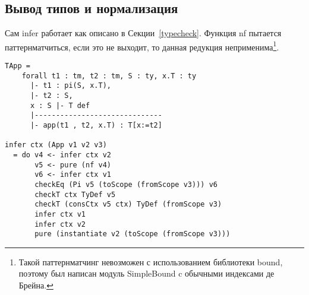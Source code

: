 \subsection{Вывод типов и нормализация}
Сам infer работает как описано в Секции~\ref{typecheck}. Функция nf пытается паттернматчиться, если это не выходит, то данная редукция неприменима\footnote{Такой паттернматчинг невозможен с использованием библиотеки bound\cite{bound}, поэтому был написан модуль SimpleBound c обычными индексами де Брейна.}.

\begin{lstlisting}[caption={Пример правила вывода и части сгенерированной функции infer, соответствующей этому правилу},captionpos=b]
TApp =
    forall t1 : tm, t2 : tm, S : ty, x.T : ty
      |- t1 : pi(S, x.T),
      |- t2 : S,
      x : S |- T def
      |------------------------------
      |- app(t1 , t2, x.T) : T[x:=t2]

infer ctx (App v1 v2 v3)
  = do v4 <- infer ctx v2
       v5 <- pure (nf v4)
       v6 <- infer ctx v1
       checkEq (Pi v5 (toScope (fromScope v3))) v6
       checkT ctx TyDef v5
       checkT (consCtx v5 ctx) TyDef (fromScope v3)
       infer ctx v1
       infer ctx v2
       pure (instantiate v2 (toScope (fromScope v3)))
\end{lstlisting}
